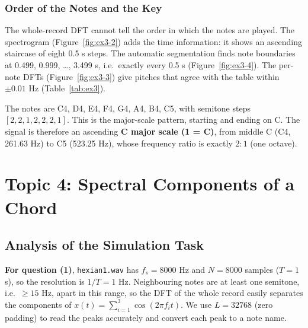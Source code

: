 \documentclass[12pt, a4paper]{article}
\begin{document}
\subsubsection{Order of the Notes and the Key}
The whole-record DFT cannot tell the order in which the notes are played. The spectrogram (Figure~\ref{fig:ex3-2}) adds the time information: it shows an ascending staircase of eight 0.5 s steps. The automatic segmentation finds note boundaries at 0.499, 0.999, \dots, 3.499 s, i.e.\ exactly every 0.5 s (Figure~\ref{fig:ex3-4}). The per-note DFTs (Figure~\ref{fig:ex3-3}) give pitches that agree with the table within $\pm0.01$ Hz (Table~\ref{tab:ex3}).

The notes are C4, D4, E4, F4, G4, A4, B4, C5, with semitone steps $[2,2,1,2,2,2,1]$. This is the major-scale pattern, starting and ending on C. The signal is therefore an ascending \textbf{C major scale (1 = C)}, from middle C (C4, 261.63 Hz) to C5 (523.25 Hz), whose frequency ratio is exactly $2{:}1$ (one octave).

\section{Topic 4: Spectral Components of a Chord}

\subsection{Analysis of the Simulation Task}

\textbf{For question (1)}, \texttt{hexian1.wav} has $f_s=8000$ Hz and $N=8000$ samples ($T=1$ s), so the resolution is $1/T=1$ Hz. Neighbouring notes are at least one semitone, i.e.\ $\ge15$ Hz, apart in this range, so the DFT of the whole record easily separates the components of $x(t)=\sum_{i=1}^{3}\cos(2\pi f_it)$. We use $L=32768$ (zero padding) to read the peaks accurately and convert each peak to a note name.
\end{document}
